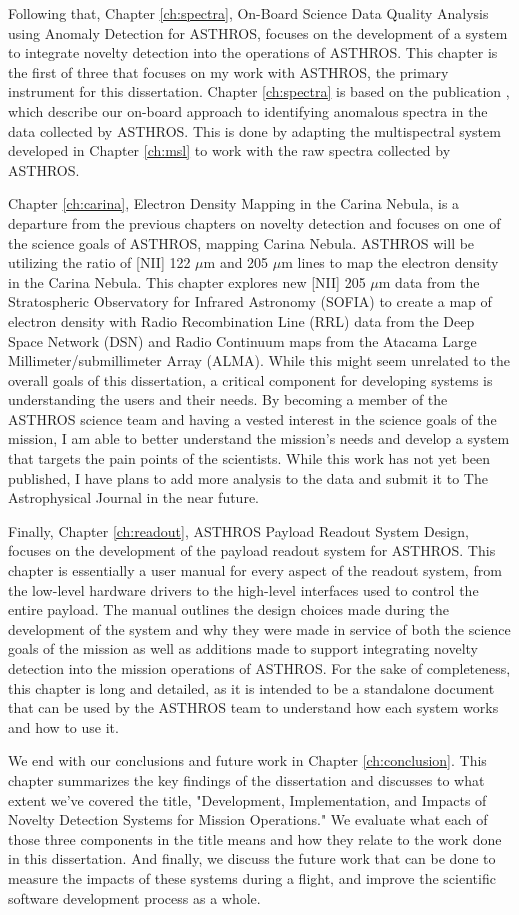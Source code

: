 Following that, Chapter \ref{ch:spectra}, On-Board Science Data Quality Analysis using Anomaly Detection for ASTHROS, focuses on the development of a system to integrate novelty detection into the operations of ASTHROS.
This chapter is the first of three that focuses on my work with ASTHROS, the primary instrument for this dissertation.
Chapter \ref{ch:spectra} is based on the publication \cite{horton2024board}, which describe our on-board approach to identifying anomalous spectra in the data collected by ASTHROS.
This is done by adapting the multispectral system developed in Chapter \ref{ch:msl} to work with the raw spectra collected by ASTHROS.

Chapter \ref{ch:carina}, Electron Density Mapping in the Carina Nebula, is a departure from the previous chapters on novelty detection and focuses on one of the science goals of ASTHROS, mapping Carina Nebula. 
ASTHROS will be utilizing the ratio of [NII] 122 $\mu$m and 205 $\mu$m lines to map the electron density in the Carina Nebula.
This chapter explores new [NII] 205 $\mu$m data from the Stratospheric Observatory for Infrared Astronomy (SOFIA) to create a map of electron density with Radio Recombination Line (RRL) data from the Deep Space Network (DSN) and Radio Continuum maps from the Atacama Large Millimeter/submillimeter Array (ALMA).
While this might seem unrelated to the overall goals of this dissertation, a critical component for developing systems is understanding the users and their needs.
By becoming a member of the ASTHROS science team and having a vested interest in the science goals of the mission, I am able to better understand the mission's needs and develop a system that targets the pain points of the scientists.
While this work has not yet been published, I have plans to add more analysis to the data and submit it to The Astrophysical Journal in the near future.

Finally, Chapter \ref{ch:readout}, ASTHROS Payload Readout System Design, focuses on the development of the payload readout system for ASTHROS.
This chapter is essentially a user manual for every aspect of the readout system, from the low-level hardware drivers to the high-level interfaces used to control the entire payload.
The manual outlines the design choices made during the development of the system and why they were made in service of both the science goals of the mission as well as additions made to support integrating novelty detection into the mission operations of ASTHROS.
For the sake of completeness, this chapter is long and detailed, as it is intended to be a standalone document that can be used by the ASTHROS team to understand how each system works and how to use it.

We end with our conclusions and future work in Chapter \ref{ch:conclusion}.
This chapter summarizes the key findings of the dissertation and discusses to what extent we've covered the title, "Development, Implementation, and Impacts of Novelty Detection Systems for Mission Operations."
We evaluate what each of those three components in the title means and how they relate to the work done in this dissertation.
And finally, we discuss the future work that can be done to measure the impacts of these systems during a flight, and improve the scientific software development process as a whole.